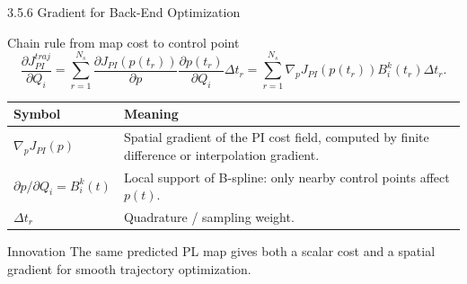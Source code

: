 \documentclass[10pt,aspectratio=169,xcolor=dvipsnames]{beamer}
\begin{document}
\begin{frame}{3.5.6 Gradient for Back-End Optimization}
  \small
  \begin{block}{Chain rule from map cost to control point}
    \[
      \frac{\partial J_{PI}^{traj}}{\partial Q_i}
      =\sum_{r=1}^{N_s}
      \frac{\partial J_{PI}(p(t_r))}{\partial p}
      \frac{\partial p(t_r)}{\partial Q_i}\Delta t_r
      =\sum_{r=1}^{N_s}
      \nabla_pJ_{PI}(p(t_r))B_i^k(t_r)\Delta t_r.
    \]
  \end{block}

  \begin{table}\scriptsize
    \begin{tabular}{p{} p{}}
      \toprule
      \textbf{Symbol} & \textbf{Meaning}\\
      \midrule
      $\nabla_pJ_{PI}(p)$ & Spatial gradient of the PI cost field, computed by finite difference or interpolation gradient.\\
      $\partial p/\partial Q_i=B_i^k(t)$ & Local support of B-spline: only nearby control points affect $p(t)$.\\
      $\Delta t_r$ & Quadrature / sampling weight.\\
      \bottomrule
    \end{tabular}
  \end{table}

  \begin{exampleblock}{Innovation}
    \footnotesize The same predicted PL map gives both a scalar cost and a spatial gradient for smooth trajectory optimization.
  \end{exampleblock}
\end{frame}
\end{document}
